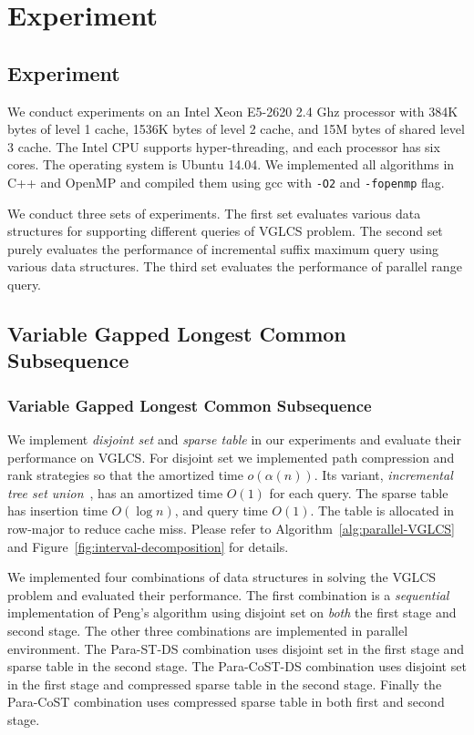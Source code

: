 \ifdefined\MasterThesis
\chapter{Experiment} 
\else
\section{Experiment} 
\fi
\label{sec:Experiment}

We conduct experiments on an Intel Xeon E5-2620 2.4 Ghz processor with
384K bytes of level 1 cache, 1536K bytes of level 2 cache, and 15M
bytes of shared level 3 cache.  The Intel CPU supports
hyper-threading, and each processor has six cores.  The operating
system is Ubuntu 14.04.  We implemented all algorithms in C++ and
OpenMP and compiled them using gcc with {\tt -O2} and {\tt -fopenmp}
flag.

We conduct three sets of experiments.  The first set evaluates various
data structures for supporting different queries of VGLCS problem.
The second set purely evaluates the performance of incremental suffix
maximum query using various data structures.  The third set evaluates
the performance of parallel range query.

\ifdefined\MasterThesis
\section{Variable Gapped Longest Common Subsequence}
\else
\subsection{Variable Gapped Longest Common Subsequence}
\fi

We implement {\em disjoint set} and {\em sparse table} in our
experiments and evaluate their performance on VGLCS.  For disjoint set
we implemented path compression and rank strategies so that the
amortized time $o(\alpha(n))$.  Its variant, {\em incremental tree set
  union}~\cite{Gabow1983ALA}, has an amortized time $O(1)$ for each
query.  The sparse table has insertion time $O(\log n)$, and query
time $O(1)$.  The table is allocated in row-major to reduce cache
miss.  Please refer to Algorithm~\ref{alg:parallel-VGLCS} and
Figure~\ref{fig:interval-decomposition} for details.

We implemented four combinations of data structures in solving the VGLCS
problem and evaluated their performance.  The first combination is a
{\em sequential} implementation of Peng's algorithm using disjoint set
on {\em both} the first stage and second stage.  The other three
combinations are implemented in parallel environment.  The {\sc
Para-ST-DS} combination uses disjoint set in the first stage and sparse
table in the second stage.  The {\sc Para-CoST-DS} combination uses
disjoint set in the first stage and compressed sparse table in the
second stage. Finally the {\sc Para-CoST} combination uses compressed
sparse table in both first and second stage.

